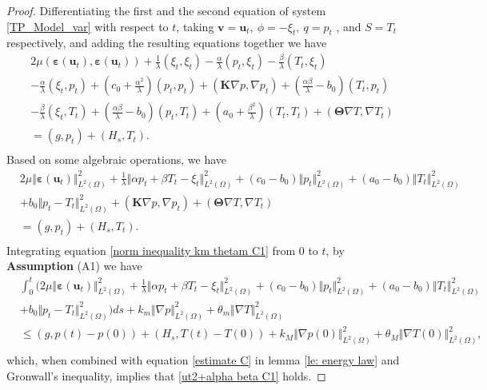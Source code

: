 \documentclass{article}
\numberwithin{equation}{section}
\begin{document}
 \begin{proof}
Differentiating the first and the second equation of system \eqref{TP_Model_var} with respect to $t$,
 taking $\bm v = \bm u_t ,~\phi = - \xi_t,~q = p_t$ , and $S = T_t$  respectively, and adding the resulting equations together we have
\begin{equation}    
\begin{aligned} 
&2\mu(\bm\varepsilon( \bm u_t),\bm\varepsilon( \bm u_t))+\frac{1}{\lambda}( \xi_t, \xi_t)-\frac{\alpha}{\lambda}( p_t, \xi_t)-\frac{\beta}{\lambda}( T_t, \xi_t)\\
& -\frac\alpha\lambda( \xi_t , p_t)+(c_0+\frac{\alpha^2}{\lambda})( p_t , p_t)+(\bm K \nabla p,\nabla p_t)+ (\frac{\alpha\beta}{\lambda}-b_0)( T_t , p_t)\\
& -\frac\beta\lambda( \xi_t , T_t)+(\frac{\alpha\beta}{\lambda}-b_0)( p_t , T_t)+(a_0+\frac{\beta^2}{\lambda})( T_t , T_t)   
  +(\bm\Theta\nabla T,\nabla T_t)\\
&=   (g, p_t) + ( H_{s}, T_t).\\
\end{aligned}
\end{equation}
 Based on some algebraic operations, we have
\begin{equation}\label{norm inequality km thetam C1}
\begin{aligned} 
& 2\mu\Vert\bm\varepsilon( \bm u_t)\Vert_{L^2(\Omega)}^2  
  +\frac1{ \lambda}\Vert\alpha  p_t+\beta  T_t- \xi_t\Vert_{L^2(\Omega)}^2
  +(c_0-b_0) \Vert p_t\Vert_{L^2(\Omega)}^2  
 +(a_0-b_0) \Vert T_t\Vert_{L^2(\Omega)}^2 \\
&+ b_0  \Vert  p_t- T_t\Vert_{L^2(\Omega)}^2  
+(\bm K \nabla p,\nabla p_t)
 +(\bm\Theta\nabla T,\nabla T_t)\\
&=    (g, p_t) + ( H_{s}, T_t).\\
\end{aligned}
\end{equation}
Integrating equation \eqref{norm inequality km thetam C1} from $0$ to $t$, by {\bf Assumption} (A1) we have
\begin{equation}  
\begin{aligned} 
& \int_0^t\Big( 2\mu\Vert\bm\varepsilon( \bm u_t)\Vert_{L^2(\Omega)}^2  
  +\frac1{ \lambda}\Vert\alpha  p_t+\beta  T_t- \xi_t\Vert_{L^2(\Omega)}^2
  +(c_0-b_0) \Vert p_t\Vert_{L^2(\Omega)}^2  
 +(a_0-b_0) \Vert T_t\Vert_{L^2(\Omega)}^2 \\
&+ b_0  \Vert  p_t- T_t\Vert_{L^2(\Omega)}^2 \Big)ds 
+ k_m \Vert\nabla p\Vert_{L^2(\Omega)}^2
 +\theta_m \Vert\nabla T\Vert_{L^2(\Omega)}^2\\
&\le    (g,p(t)-p(0)) + ( H_{s},T(t)-T(0)) 
      + k_M \Vert\nabla p(0)\Vert_{L^2(\Omega)}^2
 +\theta_M \Vert\nabla T(0)\Vert_{L^2(\Omega)}^2,\\
\end{aligned}
\end{equation}
which, when combined with equation \eqref{estimate C} in lemma \ref{le: energy law} and Gronwall's inequality, implies that \eqref{ut2+alpha beta C1} holds.



\end{proof}
\end{document}
